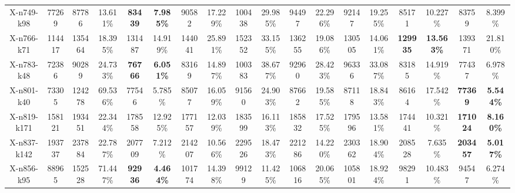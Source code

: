 \documentclass{article}
\theoremstyle{plain}
\theoremstyle{definition}
\theoremstyle{remark}
\begin{document}
\begin{table}[htbp]
\begin{center}
\begin{small}
{\begin{tabular}{cc|cccccccccccccccc}
X-n749-k98       & 77269      & 87786        & 13.611\%      & \cellcolor[HTML]{D0CECE}\textbf{83439}  & \cellcolor[HTML]{D0CECE}\textbf{7.985\%} & 90582        & 17.229\%      & 100438       & 29.985\%      & 94497         & 22.296\%       & 92147           & 19.255\%          & 85171           & 10.227\%          & 83759            & 8.399\%           \\
X-n766-k71       & 114417     & 135464       & 18.395\%      & 131487          & 14.919\%         & 144041       & 25.891\%      & 152352       & 33.155\%      & 136255        & 19.086\%       & 130505          & 14.061\%          & \cellcolor[HTML]{D0CECE}\textbf{129935} & \cellcolor[HTML]{D0CECE}\textbf{13.563\%} & 139371           & 21.810\%          \\
X-n783-k48       & 72386      & 90289        & 24.733\%      & \cellcolor[HTML]{D0CECE}\textbf{76766}  & \cellcolor[HTML]{D0CECE}\textbf{6.051\%} & 83169        & 14.897\%      & 100383       & 38.677\%      & 92960         & 28.423\%       & 96336           & 33.087\%          & 83185           & 14.919\%          & 77437            & 6.978\%           \\
X-n801-k40       & 73305      & 124278       & 69.536\%      & 77546           & 5.785\%          & 85077        & 16.059\%      & 91560        & 24.903\%      & 87662         & 19.585\%       & 87118           & 18.843\%          & 86164           & 17.542\%          & \cellcolor[HTML]{D0CECE}\textbf{77369}   & \cellcolor[HTML]{D0CECE}\textbf{5.544\%}  \\
X-n819-k171      & 158121     & 193451       & 22.344\%      & 178558          & 12.925\%         & 177157       & 12.039\%      & 183599       & 16.113\%      & 185832        & 17.525\%       & 179596          & 13.581\%          & 174441          & 10.321\%          & \cellcolor[HTML]{D0CECE}\textbf{171024}  & \cellcolor[HTML]{D0CECE}\textbf{8.160\%}  \\
X-n837-k142      & 193737     & 237884       & 22.787\%      & 207709          & 7.212\%          & 214207       & 10.566\%      & 229526       & 18.473\%      & 221286        & 14.220\%       & 230362          & 18.904\%          & 208528          & 7.635\%           & \cellcolor[HTML]{D0CECE}\textbf{203457}  & \cellcolor[HTML]{D0CECE}\textbf{5.017\%}  \\
X-n856-k95       & 88965      & 152528       & 71.447\%      & \cellcolor[HTML]{D0CECE}\textbf{92936}  & \cellcolor[HTML]{D0CECE}\textbf{4.464\%} & 101774       & 14.398\%      & 99129        & 11.425\%      & 106816        & 20.065\%       & 105801          & 18.924\%          & 98291           & 10.483\%          & 94547            & 6.274\%           \\

\end{tabular}}
\end{small}
\end{center}
\end{table}
\end{document}
